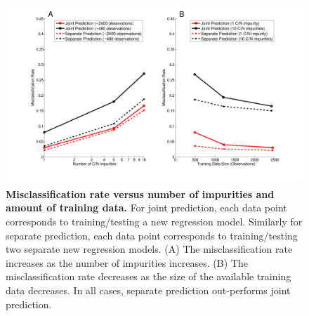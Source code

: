 \documentclass[12pt]{article}
\begin{document}
\clearpage
\begin{figure}[!ht]
\centerline{\includegraphics[width=6in]{Figures/combinedContaminationTrainingdata.pdf}}
\caption{\label{fig:misclassification}\textbf{Misclassification rate versus number of impurities and amount of training data.} For joint prediction, each data point corresponds to training/testing a new regression model. Similarly for separate prediction, each data point corresponds to training/testing two separate new regression models. (A) The misclassification rate increases as the number of impurities increases. (B) The misclassification rate decreases as the size of the available training data decreases. In all cases, separate prediction out-performs joint prediction.}
\end{figure}
\end{document}

